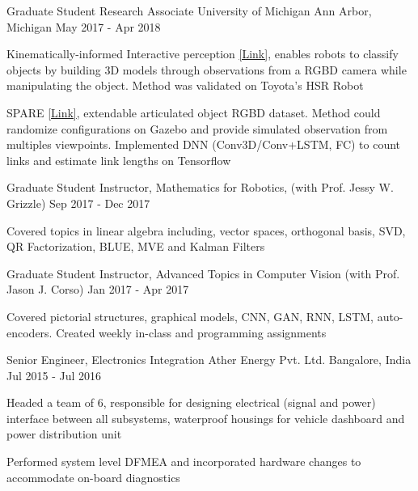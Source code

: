 \begin{cventries}
  \cventry
    {Graduate Student Research Associate} %
    {University of Michigan} %
    {Ann Arbor, Michigan} %
    {May 2017 - Apr 2018} %
    {
      \begin{cvitems} %
        \item {Kinematically-informed Interactive perception \href{https://arxiv.org/pdf/1901.05580}{[Link]}, enables robots to classify objects by building 3D models through observations from a RGBD camera while manipulating the object. Method was validated on Toyota’s HSR Robot}
        \item SPARE {\href{https://arxiv.org/pdf/1803.11147}{[Link]}, extendable articulated object RGBD dataset. Method could randomize configurations on Gazebo and provide simulated observation from multiples viewpoints. Implemented DNN (Conv3D/Conv+LSTM, FC) to count links and estimate link lengths on Tensorflow}
      \end{cvitems}
    }

  \cventry
	{Graduate Student Instructor, Mathematics for Robotics, (with Prof. Jessy W. Grizzle)} %
	{} %
	{} %
	{Sep 2017 - Dec 2017} %
	{
		\begin{cvitems} %
			\item {Covered topics in linear algebra including, vector spaces, orthogonal basis, SVD, QR Factorization, BLUE, MVE and Kalman Filters}
		\end{cvitems}
	}
  \cventry
	{Graduate Student Instructor, Advanced Topics in Computer Vision (with Prof. Jason J. Corso)} %
	{} %
	{} %
	{Jan 2017 - Apr	 2017} %
	{
		\begin{cvitems} %
			\item {Covered pictorial structures, graphical models, CNN, GAN, RNN, LSTM, auto-encoders. Created weekly in-class and programming assignments}
		\end{cvitems}
	}      
\vspace{0.4cm}
  \cventry
    {Senior Engineer, Electronics Integration} %
    {Ather Energy Pvt. Ltd.} %
    {Bangalore, India} %
    {Jul 2015 - Jul 2016} %
    {
      \begin{cvitems} %
        \item{Headed a team of 6, responsible for designing electrical (signal and power) interface between all subsystems, waterproof housings for vehicle dashboard and power distribution unit}
        \item {Performed system level DFMEA and incorporated hardware changes to accommodate on-board diagnostics}
      \end{cvitems}
    }


\end{cventries}
